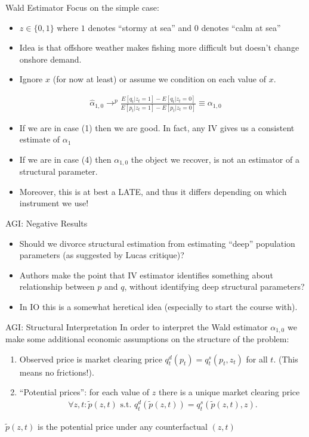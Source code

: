 \documentclass[xcolor=pdftex,dvipsnames,table,mathserif,aspectratio=169]{beamer}
\begin{document}
\begin{frame}{Wald Estimator}
Focus on the simple case:
\begin{itemize}
\item $z \in \{0,1\}$ where $1$ denotes ``stormy at sea'' and 0 denotes ``calm at sea''
\item Idea is that offshore weather makes fishing more difficult but doesn't change onshore demand.
\item Ignore $x$ (for now at least) or assume we condition on each value of $x$.
\end{itemize}
\begin{eqnarray*}
\hat{\alpha}_{1,0}  \rightarrow^p \frac{E[q_t | z_t=1] - E[q_t | z_t=0]}{E[p_t | z_t=1] - E[p_t | z_t =0]} \equiv \alpha_{1,0}
\end{eqnarray*}
\begin{itemize}
\item If we are in case (1) then we are good. In fact, any IV gives us a consistent estimate of $\alpha_1$
\item If we are in case (4) then $\alpha_{1,0}$ the object we recover, is not an estimator of a structural parameter.
\item Moreover, this is at best a LATE, and thus it differs depending on which instrument we use!
\end{itemize}
\end{frame}


\begin{frame}{AGI: Negative Results}
\begin{itemize}
\item Should we divorce structural estimation from estimating ``deep'' population parameters (as suggested by Lucas critique)?
\item Authors make the point that IV estimator identifies something about relationship between $p$ and $q$, without identifying deep structural parameters?
\item In IO this is a somewhat heretical idea (especially to start the course with).
\end{itemize}
\end{frame}

\begin{frame}{AGI: Structural Interpretation}
In order to interpret the Wald estimator $\alpha_{1,0}$ we make some additional \alert{economic} assumptions on the structure of the problem:
\begin{enumerate}
\item Observed price is market clearing price $q_t^d(p_t) = q_t^s(p_t,z_t)$ for all $t$. (This means no frictions!).
\item ``Potential prices'': for each value of $z$ there is a unique market clearing price
\begin{eqnarray*}
\forall z,t : \tilde{p}(z,t) \mbox{ s.t. } q_t^d(\tilde{p}(z,t)) = q_t^s(\tilde{p}(z,t),z).
\end{eqnarray*}
\end{enumerate}
$\tilde{p}(z,t)$ is the potential price under any counterfactual $(z,t)$
\end{frame}
\end{document}
